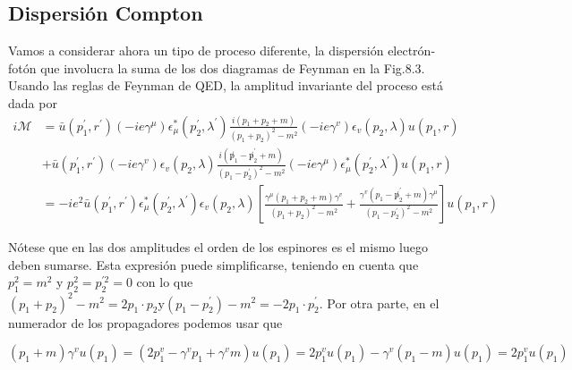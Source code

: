\subsection{Dispersión Compton}
Vamos a considerar ahora un tipo de proceso diferente, la dispersión electrón-fotón que involucra la suma de los dos diagramas de Feynman en la Fig.8.3. Usando las reglas de Feynman de QED, la amplitud invariante del proceso está dada por
$$
\begin{aligned}
i \mathscr{M} & =\bar{u}\left(p_{1}^{\prime}, r^{\prime}\right)\left(-i e \gamma^{\mu}\right) \epsilon_{\mu}^{*}\left(p_{2}^{\prime}, \lambda^{\prime}\right) \frac{i\left(p_{1}+p_{2}+m\right)}{\left(p_{1}+p_{2}\right)^{2}-m^{2}}\left(-i e \gamma^{v}\right) \epsilon_{v}\left(p_{2}, \lambda\right) u\left(p_{1}, r\right) \\
& +\bar{u}\left(p_{1}^{\prime}, r^{\prime}\right)\left(-i e \gamma^{v}\right) \epsilon_{v}\left(p_{2}, \lambda\right) \frac{i\left(\not p_{1}-\not p_{2}^{\prime}+m\right)}{\left(p_{1}-p_{2}^{\prime}\right)^{2}-m^{2}}\left(-i e \gamma^{\mu}\right) \epsilon_{\mu}^{*}\left(p_{2}^{\prime}, \lambda^{\prime}\right) u\left(p_{1}, r\right) \\
& =-i e^{2} \bar{u}\left(p_{1}^{\prime}, r^{\prime}\right) \epsilon_{\mu}^{*}\left(p_{2}^{\prime}, \lambda^{\prime}\right) \epsilon_{v}\left(p_{2}, \lambda\right)\left[\frac{\gamma^{\mu}\left(p_{1}+p_{2}+m\right) \gamma^{v}}{\left(p_{1}+p_{2}\right)^{2}-m^{2}}+\frac{\gamma^{v}\left(p_{1}-\not p_{2}^{\prime}+m\right) \gamma^{\mu}}{\left(p_{1}-p_{2}^{\prime}\right)^{2}-m^{2}}\right] u\left(p_{1}, r\right) \tag{8.29}
\end{aligned}
$$

Nótese que en las dos amplitudes el orden de los espinores es el mismo luego deben sumarse. Esta expresión puede simplificarse, teniendo en cuenta que $p_{1}^{2}=m^{2}$ y $p_{2}^{2}=p_{2}^{\prime 2}=0$ con lo que $\left(p_{1}+p_{2}\right)^{2}-m^{2}=2 p_{1} \cdot p_{2} \mathrm{y}\left(p_{1}-p_{2}^{\prime}\right)-m^{2}=-2 p_{1} \cdot p_{2}^{\prime}$. Por otra parte, en el numerador de los propagadores podemos usar que

\begin{equation*}
\left(p_{1}+m\right) \gamma^{v} u\left(p_{1}\right)=\left(2 p_{1}^{v}-\gamma^{v} p_{1}+\gamma^{v} m\right) u\left(p_{1}\right)=2 p_{1}^{v} u\left(p_{1}\right)-\gamma^{v}\left(p_{1}-m\right) u\left(p_{1}\right)=2 p_{1}^{v} u\left(p_{1}\right) \tag{8.30}
\end{equation*}


